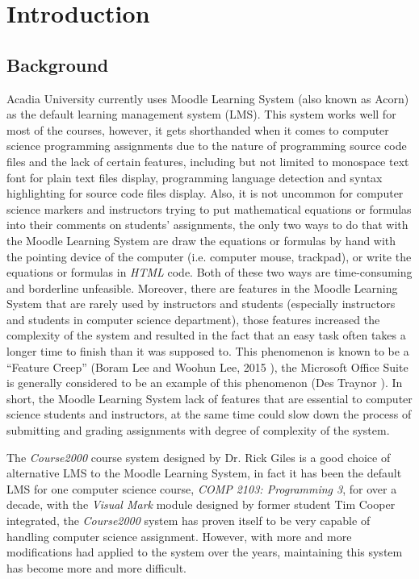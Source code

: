 

\chapter{Introduction}
\label{chap:INTRO}

\section{Background}

Acadia University currently uses Moodle Learning System (also known as 
Acorn) as the default learning management system (LMS).
This system works well for most of the courses, however, it gets
shorthanded when it comes to computer science programming assignments due to
the nature of programming source code files and the lack of certain
features, including but not limited to monospace text font for plain text
files display, programming language detection and syntax
highlighting for source code files display.
Also, it is not uncommon for computer science markers and instructors
trying to put mathematical equations or formulas into their comments on
students' assignments, the only two ways to do that with the Moodle
Learning System are draw the equations or formulas by hand with the
pointing device of the computer (i.e. computer mouse, trackpad), or write
the equations or formulas in \emph{HTML} code. Both of these two ways are
time-consuming and borderline unfeasible.
Moreover, there are features in the Moodle Learning System that are rarely
used by instructors and students (especially instructors and students in
computer science department), those features increased the
complexity of the system and resulted in the fact that an easy task 
often takes a longer time to finish than it was supposed to. This phenomenon
is known to be a ``Feature Creep''  (Boram Lee and Woohun Lee, 2015 
\cite{featureCreep}), the Microsoft Office Suite is generally
considered to be an example of this phenomenon (Des Traynor 
\cite{msFeatureCreep}).
In short, the Moodle Learning System lack of features that are essential
to computer science students and instructors, at the same time could slow
down the process of submitting and grading assignments with degree of 
complexity of the system.

\medskip

The \emph{Course2000} course system designed by Dr. Rick Giles is a good choice
of alternative LMS to the Moodle Learning System, in fact it has been the
default LMS for one computer science course, \emph{COMP 2103: Programming 3},
for over a decade, with the \emph{Visual Mark} module designed by former
student Tim Cooper integrated, the \emph{Course2000} system has proven itself
to be very capable of handling computer science assignment. However, with more
and more modifications had applied to the system over the years, maintaining
this system has become more and more difficult.

